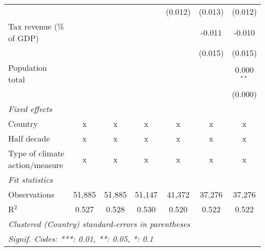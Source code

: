 \begin{tabular}{lcccccc}
                                                    &             &               &              & (0.012)        & (0.013)        & (0.012)\\   
   Tax revenue (\% of GDP)                          &             &               &              &                & -0.011         & -0.010\\   
                                                    &             &               &              &                & (0.015)        & (0.015)\\   
   Population total                                 &             &               &              &                &                & 0.000$^{**}$\\   
                                                    &             &               &              &                &                & (0.000)\\   
   \emph{Fixed effects}\\
   Country                                          & x           & x             & x            & x              & x              & x\\  
   Half decade                                      & x           & x             & x            & x              & x              & x\\  
   Type of climate action/measure                   & x           & x             & x            & x              & x              & x\\  
   \midrule \emph{Fit statistics}\\
   Observations                                     & 51,885      & 51,885        & 51,147       & 41,372         & 37,276         & 37,276\\  
   R$^2$                                            & 0.527       & 0.528         & 0.530        & 0.520          & 0.522          & 0.522\\  
   \midrule
   \multicolumn{7}{l}{\emph{Clustered (Country) standard-errors in parentheses}}\\
   \multicolumn{7}{l}{\emph{Signif. Codes: ***: 0.01, **: 0.05, *: 0.1}}\\
\end{tabular}
\par\endgroup



